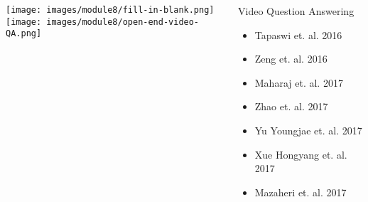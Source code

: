 \begin{frame}
	\begin{columns}
		\begin{column}{0.6\textwidth}
			\vspace{0.2in}
			\begin{overlayarea}{\textwidth}{\textheight}
				\texttt{[image: images/module8/fill-in-blank.png]}\\
				\texttt{[image: images/module8/open-end-video-QA.png]}\\
			\end{overlayarea}
		\end{column}

		\begin{column}{0.4\textwidth}
			\begin{overlayarea}{\textwidth}{\textheight}

				\begin{block}{Video Question Answering
					}
					\begin{itemize}
						\item Tapaswi et. al. 2016 \cite{DBLP:conf/cvpr/TapaswiZSTUF16}
						\item Zeng et. al. 2016 \cite{DBLP:journals/corr/ZengCCLNS16}
						\item Maharaj et. al. 2017 \cite{DBLP:conf/cvpr/MaharajBRCP17}
						\item Zhao et. al. 2017 \cite{DBLP:conf/ijcai/ZhaoYCHZ17}
						\item Yu Youngjae et. al. 2017 \cite{DBLP:conf/cvpr/YuKCK17}
						\item Xue Hongyang et. al. 2017 \cite{DBLP:journals/corr/XueZC17}
						\item Mazaheri et. al. 2017 \cite{DBLP:journals/corr/MazaheriZS16}
					\end{itemize}
				\end{block}
			\end{overlayarea}
		\end{column}

	\end{columns}
\end{frame}

